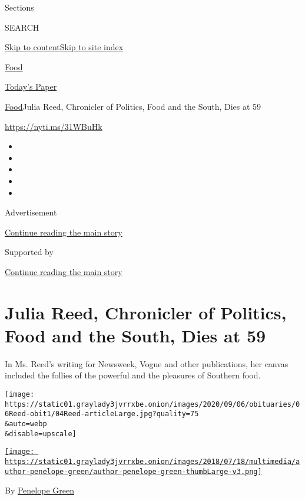Sections

SEARCH

\protect\hyperlink{site-content}{Skip to
content}\protect\hyperlink{site-index}{Skip to site index}

\href{https://www.nytimes3xbfgragh.onion/section/food}{Food}

\href{https://myaccount.nytimes3xbfgragh.onion/auth/login?response_type=cookie\&client_id=vi}{}

\href{https://www.nytimes3xbfgragh.onion/section/todayspaper}{Today's
Paper}

\href{/section/food}{Food}\textbar{}Julia Reed, Chronicler of Politics,
Food and the South, Dies at 59

\url{https://nyti.ms/31WBuHk}

\begin{itemize}
\item
\item
\item
\item
\item
\end{itemize}

Advertisement

\protect\hyperlink{after-top}{Continue reading the main story}

Supported by

\protect\hyperlink{after-sponsor}{Continue reading the main story}

\hypertarget{julia-reed-chronicler-of-politics-food-and-the-south-dies-at-59}{%
\section{Julia Reed, Chronicler of Politics, Food and the South, Dies at
59}\label{julia-reed-chronicler-of-politics-food-and-the-south-dies-at-59}}

In Ms. Reed's writing for Newsweek, Vogue and other publications, her
canvas included the follies of the powerful and the pleasures of
Southern food.

\texttt{[image: https://static01.graylady3jvrrxbe.onion/images/2020/09/06/obituaries/06Reed-obit1/04Reed-articleLarge.jpg?quality=75\\\&auto=webp\\\&disable=upscale]}

\href{https://www.nytimes3xbfgragh.onion/by/penelope-green}{\texttt{[image: https://static01.graylady3jvrrxbe.onion/images/2018/07/18/multimedia/author-penelope-green/author-penelope-green-thumbLarge-v3.png]}}

By \href{https://www.nytimes3xbfgragh.onion/by/penelope-green}{Penelope
Green}

